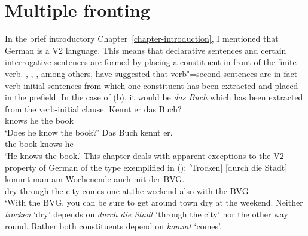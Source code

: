 
\newcommand{\ao}{Avgustinova und Oliva\xspace}%


\chapter{Multiple fronting}
\label{chapter-mult-front}


In the brief introductory Chapter~\ref{chapter-introduction}, I mentioned that German is a V2
language. This means that declarative sentences and certain interrogative sentences are formed by
placing a constituent in front of the finite verb.
\citet{Thiersch78a}, \citet[]{denBesten83a}, \citet{Uszkoreit87a}, among others, have suggested that
verb"=second sentences are in fact verb-initial sentences from which one constituent has been extracted and placed in the prefield. 
In the case of (b), it would be \emph{das Buch} which has been extracted from the verb-initial clause.
\eal
\ex 
\gll Kennt er das Buch?\\
	 knows he the book\\
\glt `Does he know the book?'
\ex 
\gll Das Buch kennt er.\\
	 the book knows he\\
\glt `He knows the book.'
\zl
This chapter deals with apparent exceptions to the V2 property of German of the type exemplified in ():
\ea
\gll {}[Trocken] [durch die Stadt] kommt man am Wochenende auch mit der BVG.\footnotemark\\
	 \spacebr{}dry \spacebr{}through the city comes one at.the weekend also with the BVG\\
\glt `With the BVG, you can be sure to get around town dry at the weekend.
\z
Neither \emph{trocken} `dry' depends on \emph{durch die Stadt} `through the city' nor the other way
round. Rather both constituents depend on \emph{kommt} `comes'.

